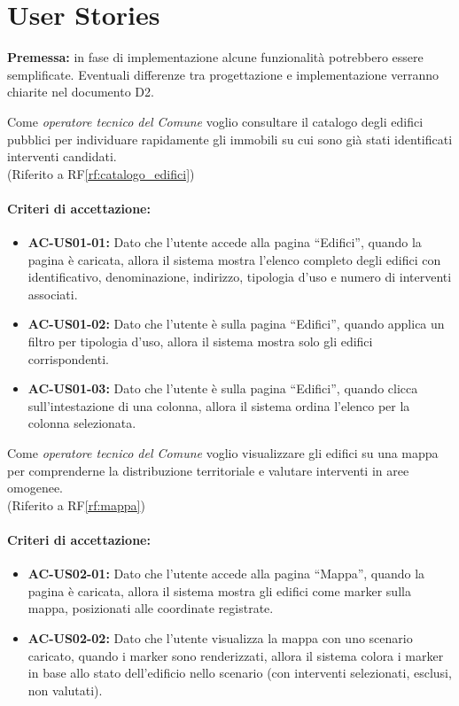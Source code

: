 \section{User Stories}

\textbf{Premessa:} in fase di implementazione alcune funzionalità potrebbero essere semplificate. Eventuali differenze tra progettazione e implementazione verranno chiarite nel documento D2.

 \label{us:edifici}
Come \textit{operatore tecnico del Comune} voglio consultare il catalogo degli edifici pubblici per individuare rapidamente gli immobili su cui sono già stati identificati interventi candidati. \\ (Riferito a RF\ref{rf:catalogo_edifici})

\paragraph{Criteri di accettazione:}
\begin{itemize}
    \item \textbf{AC-US01-01:} Dato che l'utente accede alla pagina ``Edifici'', quando la pagina è caricata, allora il sistema mostra l'elenco completo degli edifici con identificativo, denominazione, indirizzo, tipologia d'uso e numero di interventi associati.
    \item \textbf{AC-US01-02:} Dato che l'utente è sulla pagina ``Edifici'', quando applica un filtro per tipologia d'uso, allora il sistema mostra solo gli edifici corrispondenti.
    \item \textbf{AC-US01-03:} Dato che l'utente è sulla pagina ``Edifici'', quando clicca sull'intestazione di una colonna, allora il sistema ordina l'elenco per la colonna selezionata.
\end{itemize}

 \label{us:mappa}
Come \textit{operatore tecnico del Comune} voglio visualizzare gli edifici su una mappa per comprenderne la distribuzione territoriale e valutare interventi in aree omogenee. \\ (Riferito a RF\ref{rf:mappa})

\paragraph{Criteri di accettazione:}
\begin{itemize}
    \item \textbf{AC-US02-01:} Dato che l'utente accede alla pagina ``Mappa'', quando la pagina è caricata, allora il sistema mostra gli edifici come marker sulla mappa, posizionati alle coordinate registrate.
    \item \textbf{AC-US02-02:} Dato che l'utente visualizza la mappa con uno scenario caricato, quando i marker sono renderizzati, allora il sistema colora i marker in base allo stato dell'edificio nello scenario (con interventi selezionati, esclusi, non valutati).
\end{itemize}

